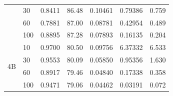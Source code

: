 \begin{table}[!htbp]
\begin{tabular}{llrrrrr}
 & 30 & 0.8411 & 86.48 & 0.10461 & 0.79386 & 0.759 \\
 & 60 & 0.7881 & 87.00 & 0.08781 & 0.42954 & 0.489 \\
 & 100 & 0.8895 & 87.28 & 0.07893 & 0.16135 & 0.204 \\
\midrule
\multirow{4}{*}{4B} & 10 & 0.9700 & 80.50 & 0.09756 & 6.37332 & 6.533 \\
 & 30 & 0.9553 & 80.09 & 0.05850 & 0.95356 & 1.630 \\
 & 60 & 0.8917 & 79.46 & 0.04840 & 0.17338 & 0.358 \\
 & 100 & 0.9471 & 79.06 & 0.04462 & 0.03191 & 0.072 \\
\bottomrule
\end{tabular}
\end{table}
